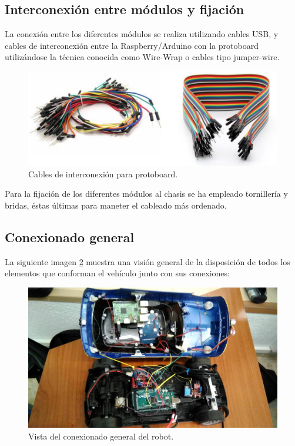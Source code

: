 \subsection{Interconexión entre módulos y fijación}

La conexión entre los diferentes módulos se realiza utilizando cables USB, y cables de interconexión entre la Raspberry/Arduino con la protoboard utilizándose la técnica
conocida como Wire-Wrap o cables tipo jumper-wire.\\

\begin{figure}[H]
  \begin{center}
    \includegraphics[scale=0.3]{imagenes/cables_interconexion.png}
  \end{center}
  \caption{Cables de interconexión para protoboard.}
  \label{figura:cables_interconexion}
\end{figure}

Para la fijación de los diferentes módulos al chasis se ha empleado tornillería y bridas, éstas últimas para maneter el cableado más ordenado.\\

\subsection{Conexionado general}

La siguiente imagen \ref{vista-conexiones} muestra una visión general de la disposición de todos los elementos que conforman el vehículo junto con sus conexiones:\\


\begin{figure}[H]
  \begin{center}
   \includegraphics[scale=0.2]{imagenes/robot/conexionado_general.jpeg}
  \end{center}
  \caption{Vista del conexionado general del robot.}
  \label{vista-conexiones}
\end{figure}




